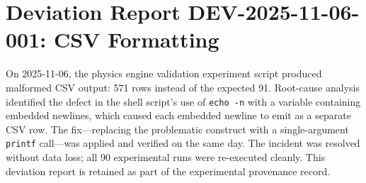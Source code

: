 
\section*{Deviation Report DEV-2025-11-06-001: CSV Formatting}

On 2025-11-06, the physics engine validation experiment script produced
malformed CSV output: 571 rows instead of the expected 91. Root-cause analysis
identified the defect in the shell script's use of \texttt{echo -n} with a
variable containing embedded newlines, which caused each embedded newline to
emit as a separate CSV row. The fix---replacing the problematic construct with
a single-argument \texttt{printf} call---was applied and verified on the same
day. The incident was resolved without data loss; all 90 experimental runs
were re-executed cleanly. This deviation report is retained as part of the
experimental provenance record.
